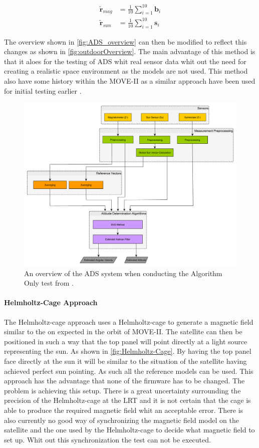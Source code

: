 \begin{subequations}\label{eq:avrgLabFrame}
\begin{align}
	\tilde{\boldsymbol{r}}_{mag} &= \frac{1}{10}\sum\limits_{i=1}^{10}\boldsymbol{b}_i \\
	\tilde{\boldsymbol{r}}_{sun} &= \frac{1}{10}\sum\limits_{i=1}^{10}\boldsymbol{s}_i 
\end{align}	
\end{subequations}  

The overview shown in \autoref{fig:ADS_overview} can then be modified to reflect this changes as shown in \autoref{fig:outdoorOverview}. The main advantage of this method is that it aloes for the testing of ADS whit real sensor data whit out the need for creating a realistic space environment as the models are not used. This method also have some history within the MOVE-II as a similar approach have been used for initial testing earlier \cite{DavidThesis}. 

\begin{figure}[tbp]
	\centering
	\includegraphics[width=0.7\columnwidth]{./Pictures/ATTDET_Architecture_Ao}
	\caption{An overview of the ADS system when conducting the Algorithm Only test from \cite{DavidThesis}.}
	\label{fig:outdoorOverview}
\end{figure} 

\paragraph{Helmholtz-Cage Approach}
The Helmholtz-cage approach uses a Helmholtz-cage to generate a magnetic field similar to the on expected in the orbit of MOVE-II. The satellite can then be positioned in such a way that the top panel will point directly at a light source representing the sun. As shown in \autoref{fig:Helmholtz-Cage}. By having the top panel face directly at the sun it will be similar to the situation of the satellite having achieved perfect sun pointing. As such all the reference models can be used. This approach has the advantage that none of the firmware has to be changed. The problem is achieving this setup. There is a great uncertainty surrounding the precision of the Helmholtz-cage at the LRT and it is not certain that the cage is able to produce the required magnetic field whit an acceptable error. There is also currently no good way of synchronizing the magnetic field model on the satellite and the one used by the Helmholtz-cage to decide what magnetic field to set up. Whit out this synchronization the test can not be executed. 

